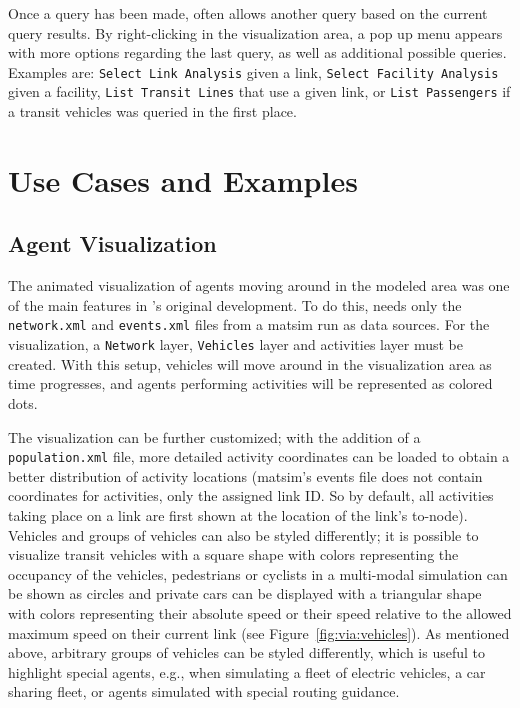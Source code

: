 Once a query has been made, \Via{} often allows another query based on the
current query results. By right-clicking in the visualization area, a pop up menu
appears with more options regarding the last query, as well as additional
possible queries. Examples are: \lstinline|Select Link Analysis|
given a link, \lstinline|Select Facility Analysis| given a facility, \lstinline|List Transit Lines| that
use a given link, or \lstinline|List Passengers| if a transit vehicles was queried in the
first place.

\section{Use Cases and Examples}
\subsection{Agent Visualization}
The animated visualization of agents moving around in the modeled area was one
of the main features in \Via{}'s original development. To do this, \Via{}
needs only the \lstinline|network.xml| and \lstinline|events.xml| files from a \gls{matsim} run
as data sources. For the visualization, a \lstinline|Network| layer, \lstinline|Vehicles| layer and
activities layer must be created. With this setup, vehicles will move around in
the visualization area as time progresses, and agents performing
activities will be represented as colored dots.

The visualization can be further customized; with the addition of
 a \lstinline|population.xml| file, more detailed activity coordinates can be loaded to obtain a
better distribution of activity locations (\gls{matsim}'s events file does not
contain coordinates for activities, only the assigned link ID. So by default,
all activities taking place on a link are first shown at the location of
the link's to-node).  Vehicles and groups of vehicles can also be styled
differently; it is possible to visualize transit vehicles with a square shape
with colors representing the occupancy of the vehicles, pedestrians or
cyclists in a multi-modal simulation can be shown as circles and private cars
can be displayed with a triangular shape with colors representing their
absolute speed or their speed relative to the allowed maximum speed on their current link
 (see Figure~\ref{fig:via:vehicles}). As mentioned above, arbitrary
groups of vehicles can be styled differently, which is useful to highlight
special agents, e.g., when simulating a fleet of electric vehicles, a car sharing
fleet, or agents simulated with special routing guidance.

